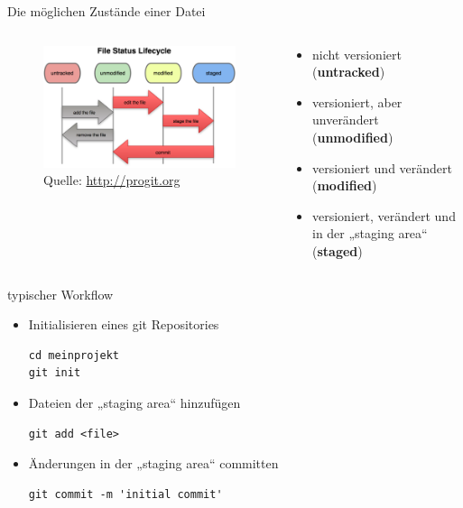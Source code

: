 \begin{frame}{Die möglichen Zustände einer Datei}
  \begin{columns}
    \begin{column}{0.45\textwidth}
      \begin{figure}
        \includegraphics[width=\textwidth]{img/file_lifecycle}
        \caption[format=empty]{Quelle: \url{http://progit.org}}
      \end{figure}
    \end{column}
    \begin{column}{0.65\textwidth}
      \begin{itemize}
        \item nicht versioniert (\textbf{untracked})
        \item versioniert, aber unverändert (\textbf{unmodified})
        \item versioniert und verändert (\textbf{modified})
        \item versioniert, verändert und in der „staging area“ (\textbf{staged})
      \end{itemize}
    \end{column}
  \end{columns}
\end{frame}

\begin{frame}[fragile]{typischer Workflow}
  \begin{itemize}
    \item Initialisieren eines git Repositories
    \begin{lstlisting}
cd meinprojekt
git init
    \end{lstlisting}
    \item Dateien der „staging area“ hinzufügen
    \begin{lstlisting}
git add <file>
    \end{lstlisting}
    \item Änderungen in der „staging area“ committen
    \begin{lstlisting}
git commit -m 'initial commit'
    \end{lstlisting}
    \end{itemize}
\end{frame}

